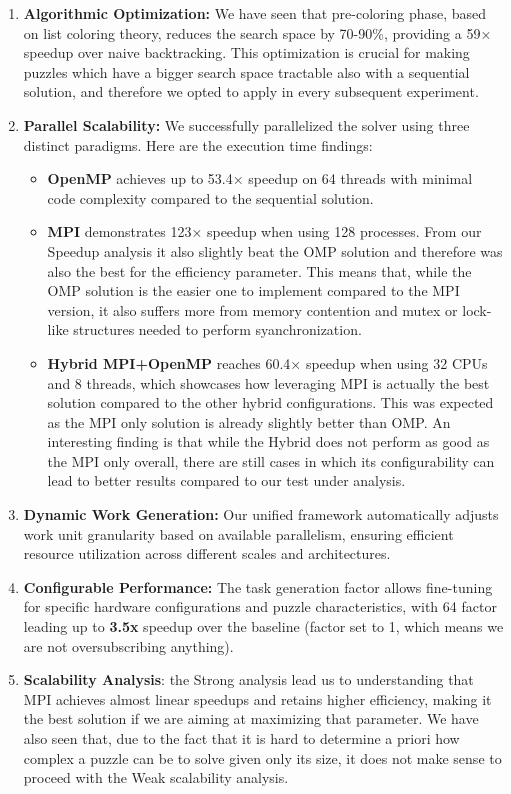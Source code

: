 \begin{enumerate}
    \item \textbf{Algorithmic Optimization:} We have seen that pre-coloring phase, based on list coloring theory, reduces the search space by 70-90\%, providing a 59× speedup over naive backtracking. This optimization is crucial for making puzzles which have a bigger search space tractable also with a sequential solution, and therefore we opted to apply in every subsequent experiment.
    
    \item \textbf{Parallel Scalability:} We successfully parallelized the solver using three distinct paradigms. Here are the execution time findings:
    \begin{itemize}
        \item \textbf{OpenMP} achieves up to 53.4× speedup on 64 threads with minimal code complexity compared to the sequential solution.
        \item \textbf{MPI} demonstrates 123× speedup when using 128 processes. From our Speedup analysis it also slightly beat the OMP solution and therefore was also the best for the efficiency parameter. This means that, while the OMP solution is the easier one to implement compared to the MPI version, it also suffers more from memory contention and mutex or lock-like structures needed to perform syanchronization.
        \item \textbf{Hybrid MPI+OpenMP} reaches 60.4× speedup when using 32 CPUs and 8 threads, which showcases how leveraging MPI is actually the best solution compared to the other hybrid configurations. This was expected as the MPI only solution is already slightly better than OMP. An interesting finding is that while the Hybrid does not perform as good as the MPI only overall, there are still cases in which its configurability can lead to better results compared to our test under analysis.
    \end{itemize}
    
    \item \textbf{Dynamic Work Generation:} Our unified framework automatically adjusts work unit granularity based on available parallelism, ensuring efficient resource utilization across different scales and architectures.
    
    \item \textbf{Configurable Performance:} The task generation factor allows fine-tuning for specific hardware configurations and puzzle characteristics, with 64 factor leading up to \textbf{3.5x} speedup over the baseline (factor set to 1, which means we are not oversubscribing anything).

    \item \textbf{Scalability Analysis}: the Strong analysis lead us to understanding that MPI achieves almost linear speedups and retains higher efficiency, making it the best solution if we are aiming at maximizing that parameter. We have also seen that, due to the fact that it is hard to determine a priori how complex a puzzle can be to solve given only its size, it does not make sense to proceed with the Weak scalability analysis.
\end{enumerate}


